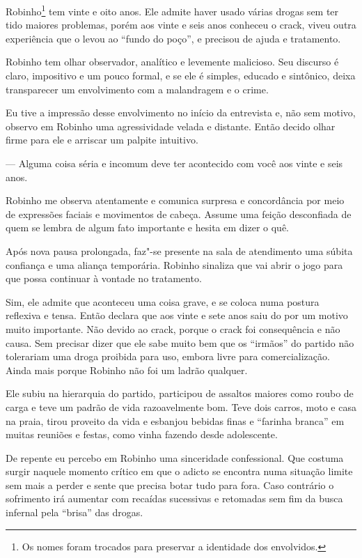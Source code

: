  

Robinho\footnote{Os nomes foram trocados para preservar a identidade dos envolvidos.} tem vinte e oito anos. Ele admite haver
usado várias drogas sem ter tido maiores problemas, porém aos vinte e
seis anos conheceu o crack, viveu outra experiência que o levou ao
``fundo do poço'', e precisou de ajuda e tratamento.

Robinho tem olhar observador, analítico e levemente malicioso. Seu
discurso é claro, impositivo e um pouco formal, e se ele é simples,
educado e sintônico, deixa transparecer um envolvimento com a
malandragem e o crime.

Eu tive a impressão desse envolvimento no início da entrevista e, não
sem motivo, observo em Robinho uma agressividade velada e distante.
Então decido olhar firme para ele e arriscar um palpite intuitivo.

— Alguma coisa séria e incomum deve ter acontecido com você aos vinte e
seis anos.

Robinho me observa atentamente e comunica surpresa e concordância por
meio de expressões faciais e movimentos de cabeça. Assume uma feição
desconfiada de quem se lembra de algum fato importante e hesita em dizer
o quê.

Após nova pausa prolongada, faz"-se presente na sala de atendimento uma
súbita confiança e uma aliança temporária. Robinho sinaliza que vai
abrir o jogo para que possa continuar à vontade no tratamento.

Sim, ele admite que aconteceu uma coisa grave, e se coloca numa postura
reflexiva e tensa. Então declara que aos vinte e sete anos saiu do 
por um motivo muito importante. Não devido ao crack, porque o crack foi
consequência e não causa. Sem precisar dizer que ele sabe muito bem que
os ``irmãos'' do partido não tolerariam uma droga proibida para uso,
embora livre para comercialização. Ainda mais porque Robinho não foi um
ladrão qualquer.

Ele subiu na hierarquia do partido, participou de assaltos maiores como
roubo de carga e teve um padrão de vida razoavelmente bom. Teve dois
carros, moto e casa na praia, tirou proveito da vida e esbanjou bebidas
finas e ``farinha branca'' em muitas reuniões e festas, como vinha
fazendo desde adolescente.

De repente eu percebo em Robinho uma sinceridade confessional. Que
costuma surgir naquele momento crítico em que o adicto se encontra numa
situação limite sem mais a perder e sente que precisa botar tudo para
fora. Caso contrário o sofrimento irá aumentar com recaídas sucessivas e
retomadas sem fim da busca infernal pela ``brisa'' das drogas.

